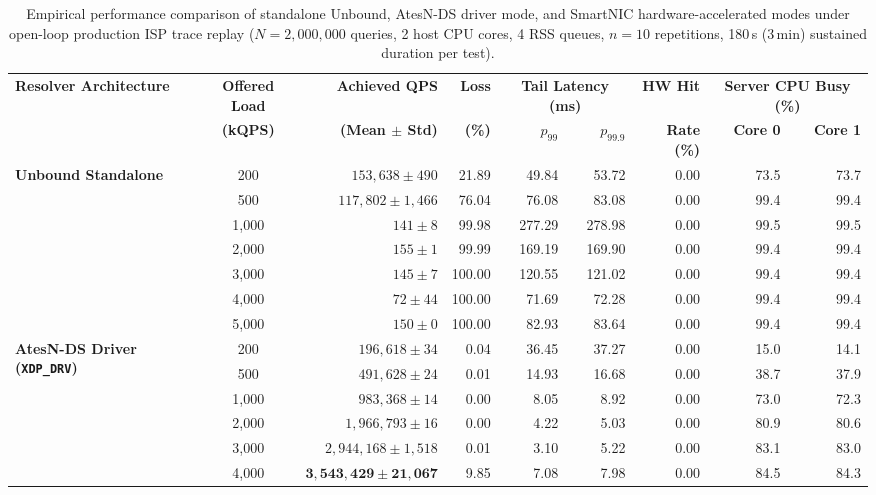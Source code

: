 \documentclass[a4paper,fleqn,colorlinks,hidelinks]{cas-sc}
\begin{document}
\begin{table}[t]
\centering
\small
\caption{Empirical performance comparison of standalone Unbound, AtesN-DS driver mode, and SmartNIC hardware-accelerated modes under open-loop production ISP trace replay ($N=2{,}000{,}000$ queries, 2 host CPU cores, 4 RSS queues, $n=10$ repetitions, 180\,s (3\,min) sustained duration per test).}
\label{tab:realtrace_benchmark_results}
\begin{tabular}{@{}lcrrrrrrr@{}}
\toprule
\textbf{Resolver Architecture} & \textbf{Offered Load} & \textbf{Achieved QPS} & \textbf{Loss} & \multicolumn{2}{c}{\textbf{Tail Latency (ms)}} & \textbf{HW Hit} & \multicolumn{2}{c}{\textbf{Server CPU Busy (\%)}} \\
\cmidrule(lr){5-6} \cmidrule(lr){8-9}
& \textbf{(kQPS)} & \textbf{(Mean $\pm$ Std)} & \textbf{(\%)} & \textbf{$p_{99}$} & \textbf{$p_{99.9}$} & \textbf{Rate (\%)} & \textbf{Core 0} & \textbf{Core 1} \\
\midrule
\multirow{7}{*}{\textbf{Unbound Standalone}}
& 200 & $153{,}638 \pm 490$ & 21.89 & 49.84 & 53.72 & 0.00 & 73.5 & 73.7 \\
& 500 & $117{,}802 \pm 1{,}466$ & 76.04 & 76.08 & 83.08 & 0.00 & 99.4 & 99.4 \\
& 1,000 & $141 \pm 8$ & 99.98 & 277.29 & 278.98 & 0.00 & 99.5 & 99.5 \\
& 2,000 & $155 \pm 1$ & 99.99 & 169.19 & 169.90 & 0.00 & 99.4 & 99.4 \\
& 3,000 & $145 \pm 7$ & 100.00 & 120.55 & 121.02 & 0.00 & 99.4 & 99.4 \\
& 4,000 & $72 \pm 44$ & 100.00 & 71.69 & 72.28 & 0.00 & 99.4 & 99.4 \\
& 5,000 & $150 \pm 0$ & 100.00 & 82.93 & 83.64 & 0.00 & 99.4 & 99.4 \\
\midrule
\multirow{7}{*}{\textbf{AtesN-DS Driver (\texttt{XDP\_DRV})}}
& 200 & $196{,}618 \pm 34$ & 0.04 & 36.45 & 37.27 & 0.00 & 15.0 & 14.1 \\
& 500 & $491{,}628 \pm 24$ & 0.01 & 14.93 & 16.68 & 0.00 & 38.7 & 37.9 \\
& 1,000 & $983{,}368 \pm 14$ & 0.00 & 8.05 & 8.92 & 0.00 & 73.0 & 72.3 \\
& 2,000 & $1{,}966{,}793 \pm 16$ & 0.00 & 4.22 & 5.03 & 0.00 & 80.9 & 80.6 \\
& 3,000 & $2{,}944{,}168 \pm 1{,}518$ & 0.01 & 3.10 & 5.22 & 0.00 & 83.1 & 83.0 \\
& 4,000 & $\mathbf{3{,}543{,}429 \pm 21{,}067}$ & 9.85 & 7.08 & 7.98 & 0.00 & 84.5 & 84.3 \\

\end{tabular}
\end{table}
\end{document}
